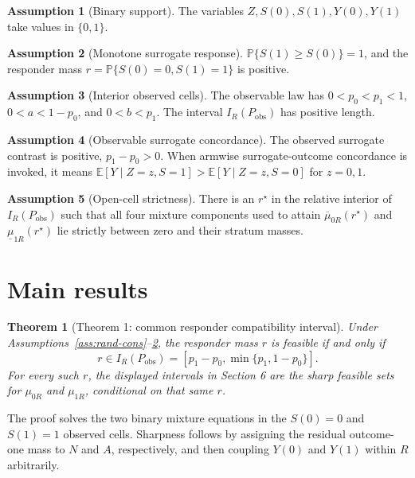 \documentclass[11pt]{article}
\newcommand{\E}{\mathbb{E}}
\renewcommand{\Pr}{\mathbb{P}}
\theoremstyle{definition}
\newtheorem{assumption}{Assumption}
\theoremstyle{plain}
\newtheorem{theorem}{Theorem}
\theoremstyle{remark}
\begin{document}
\begin{assumption}[Binary support]\label{ass:binary}
The variables \(Z,S(0),S(1),Y(0),Y(1)\) take values in \(\{0,1\}\).
\end{assumption}

\begin{assumption}[Monotone surrogate response]\label{ass:monotone}
\(\Pr\{S(1)\ge S(0)\}=1\), and the responder mass \(r=\Pr\{S(0)=0,S(1)=1\}\) is positive.
\end{assumption}

\begin{assumption}[Interior observed cells]\label{ass:interior}
The observable law has \(0<p_0<p_1<1\), \(0<a<1-p_0\), and \(0<b<p_1\). The interval \(I_R(P_{\mathrm{obs}})\) has positive length.
\end{assumption}

\begin{assumption}[Observable surrogate concordance]\label{ass:concordance}
The observed surrogate contrast is positive, \(p_1-p_0>0\). When armwise surrogate-outcome concordance is invoked, it means \(\E[Y\mid Z=z,S=1]>\E[Y\mid Z=z,S=0]\) for \(z=0,1\).
\end{assumption}

\begin{assumption}[Open-cell strictness]\label{ass:open-cell}
There is an \(r^\star\) in the relative interior of \(I_R(P_{\mathrm{obs}})\) such that all four mixture components used to attain \(\overline\mu_{0R}(r^\star)\) and \(\underline\mu_{1R}(r^\star)\) lie strictly between zero and their stratum masses.
\end{assumption}

\section{Main results}
\begin{theorem}[Theorem 1: common responder compatibility interval]\label{thm:compat-interval}
Under Assumptions~\ref{ass:rand-cons}--\ref{ass:monotone}, the responder mass \(r\) is feasible if and only if
\[
  r\in I_R(P_{\mathrm{obs}})=[p_1-p_0,\min\{p_1,1-p_0\}].
\]
For every such \(r\), the displayed intervals in Section 6 are the sharp feasible sets for \(\mu_{0R}\) and \(\mu_{1R}\), conditional on that same \(r\).
\end{theorem}
The proof solves the two binary mixture equations in the \(S(0)=0\) and \(S(1)=1\) observed cells. Sharpness follows by assigning the residual outcome-one mass to \(N\) and \(A\), respectively, and then coupling \(Y(0)\) and \(Y(1)\) within \(R\) arbitrarily.
\end{document}
